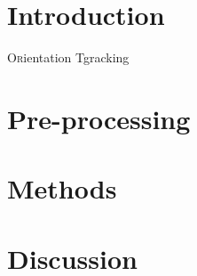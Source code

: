 \documentclass[twoside]{article}
\begin{document}
\begin{multicols}{2} %

\section{Introduction}
\lettrine[nindent=0em,lines=2]{O}rientation Tgracking


\section{Pre-processing}



\section{Methods}


\section{Discussion}


%
% 


\end{multicols}
\end{document}
